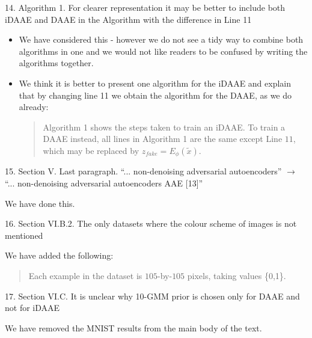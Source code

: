 \documentclass{article}
\begin{document}

{\color{blue}
14. Algorithm 1. For clearer representation it may be better to include both iDAAE and DAAE in the Algorithm with the difference in Line 11}

\begin{itemize}
    \item We have considered this - however we do not see a tidy way to combine both algorithms in one and we would not like readers to be confused by writing the algorithms together.
    \item We think it is better to present one algorithm for the iDAAE and explain that by changing line 11 we obtain the algorithm for the DAAE, as we do already:
    \begin{quote}
        Algorithm 1 shows the steps taken to train an iDAAE. To train a DAAE instead, all lines in Algorithm 1 are the same except Line $11$, which may be replaced by $z_{fake} = E_\phi(\tilde{x})$.
    \end{quote}
\end{itemize}

{\color{blue}
15. Section V. Last paragraph. ``... non-denoising adversarial autoencoders'' $\rightarrow$ ``... non-denoising adversarial autoencoders AAE [13]''} \newline

We have done this.

{\color{blue}
16. Section VI.B.2. The only datasets where the colour scheme of images is not mentioned} \newline

We have added the following: 
\begin{quote}
     Each example in the dataset is $105$-by-$105$ pixels, taking values \{0,1\}. 
\end{quote}

{\color{blue}
17. Section VI.C. It is unclear why 10-GMM prior is chosen only for DAAE and not for iDAAE} \newline

{\color{red} We have removed the MNIST results from the main body of the text.}
\end{document}
